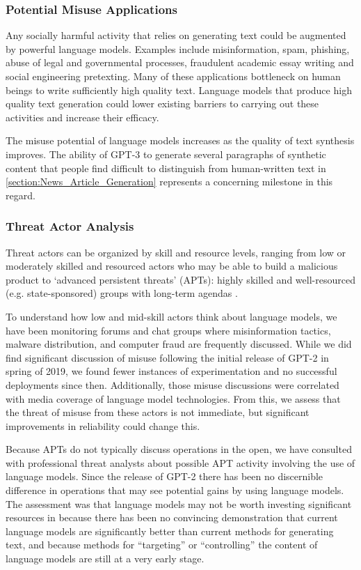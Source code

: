         \subsubsection{Potential Misuse Applications}
        \label{section:Potential_Misuse_Applications}

Any socially harmful activity that relies on generating text could be augmented by powerful language models. Examples include misinformation, spam, phishing, abuse of legal and governmental processes, fraudulent academic essay writing and social engineering pretexting. Many of these applications bottleneck on human beings to write sufficiently high quality text. Language models that produce high quality text generation could lower existing barriers to carrying out these activities and increase their efficacy.

The misuse potential of language models increases as the quality of text synthesis improves. The ability of GPT-3 to generate several paragraphs of synthetic content that people find difficult to distinguish from human-written text in \ref{section:News_Article_Generation} represents a concerning milestone in this regard.

        \subsubsection{Threat Actor Analysis}
        \label{section:Threat_Actor_Analysis}

Threat actors can be organized by skill and resource levels, ranging from low or moderately skilled and resourced actors who may be able to build a malicious product to `advanced persistent threats' (APTs): highly skilled and well-resourced (e.g. state-sponsored) groups with long-term agendas \cite{solaiman2019release}.

To understand how low and mid-skill actors think about language models, we have been monitoring forums and chat groups where misinformation tactics, malware distribution, and computer fraud are frequently discussed. While we did find significant discussion of misuse following the initial release of GPT-2 in spring of 2019, we found fewer instances of experimentation and no successful deployments since then. Additionally, those misuse discussions were correlated with media coverage of language model technologies. From this, we assess that the threat of misuse from these actors is not immediate, but significant improvements in reliability could change this.

Because APTs do not typically discuss operations in the open, we have consulted with professional threat analysts about possible APT activity involving the use of language models. Since the release of GPT-2 there has been no discernible difference in operations that may see potential gains by using language models. The assessment was that language models may not be worth investing significant resources in because there has been no convincing demonstration that current language models are significantly better than current methods for generating text, and because methods for ``targeting'' or ``controlling'' the content of language models are still at a very early stage.

